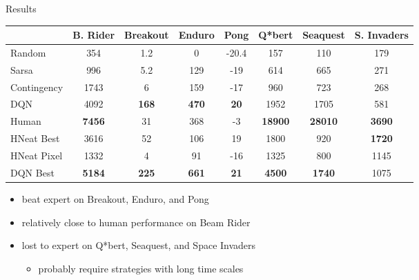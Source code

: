 \begin{frame}{Results}
    \begin{table}[htbp!]
        \begin{minipage}{\textwidth}
            \centering
            {\scriptsize
            \begin{tabular}{lccccccc}
                \toprule
                & B. Rider & Breakout & Enduro & Pong & Q*bert & Seaquest & S. Invaders \\ \midrule
                Random & 354 & 1.2 & 0 & -20.4 & 157 & 110 & 179 \\
                Sarsa & 996 & 5.2 & 129 & -19 & 614 & 665 & 271 \\
                Contingency & 1743 & 6 & 159 & -17 & 960 & 723 & 268 \\
                DQN & 4092 & \textbf{168} & \textbf{470} & \textbf{20} & 1952 & 1705 & 581 \\
                Human & \textbf{7456} & 31 & 368 & -3 & \textbf{18900} & \textbf{28010} & \textbf{3690} \\ \midrule
                HNeat Best & 3616 & 52 & 106 & 19 & 1800 & 920 & \textbf{1720} \\
                HNeat Pixel & 1332 & 4 & 91 & -16 & 1325 & 800 & 1145 \\
                DQN Best & \textbf{5184} & \textbf{225} & \textbf{661} & \textbf{21} & \textbf{4500} & \textbf{1740} & 1075 \\
                \bottomrule
            \end{tabular}
            }
            \label{table:cluster}
        \end{minipage} 
    \end{table}
    \begin{itemize}\itemsep=12pt

        \item beat expert on Breakout, Enduro, and Pong

        \item relatively close to human performance on Beam Rider

        \item lost to expert on Q*bert, Seaquest, and Space Invaders
        \vspace*{0.5em}
        \begin{itemize}
            \item probably require strategies with long time scales
        \end{itemize}

    \end{itemize}
\end{frame}

